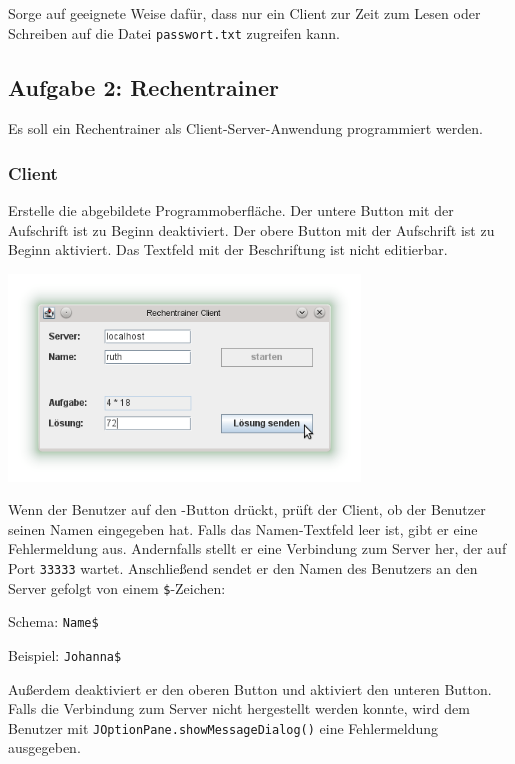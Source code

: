 Sorge auf geeignete Weise dafür, dass nur ein Client zur Zeit zum Lesen oder
Schreiben auf die Datei \lstinline|passwort.txt| zugreifen kann.


\subsection{Aufgabe 2: Rechentrainer}

Es soll ein Rechentrainer als Client-Server-Anwendung programmiert werden.

\subsubsection{Client}

Erstelle die abgebildete Programmoberfläche. Der untere Button mit der
Aufschrift  ist zu Beginn deaktiviert. Der obere
Button mit der Aufschrift  ist zu Beginn aktiviert. Das
Textfeld mit der Beschriftung  ist nicht editierbar.

\begin{center}
\includegraphics[width=0.7\textwidth]{./inf/SEKII/44_Abi-Training/Rechentrainer.png}
\end{center}

Wenn der Benutzer auf den -Button drückt, prüft der Client,
ob der Benutzer seinen Namen eingegeben hat. Falls das Namen-Textfeld leer ist,
gibt er eine Fehlermeldung aus. Andernfalls stellt er eine Verbindung zum
Server her, der auf Port \lstinline|33333| wartet. Anschließend sendet er den
Namen des Benutzers an den Server gefolgt von einem \lstinline|$|-Zeichen:

Schema:  \lstinline|Name$|	

Beispiel: \lstinline|Johanna$|

Außerdem deaktiviert er den oberen Button und aktiviert den unteren Button.
Falls die Verbindung zum Server nicht hergestellt werden konnte, wird dem
Benutzer mit \lstinline|JOptionPane.showMessageDialog()| eine Fehlermeldung
ausgegeben.

